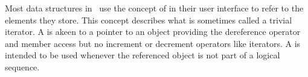 

Most data structures in \cgal\ use the concept of  in their user
interface to refer to the elements they store.  This concept describes what is
sometimes called a trivial iterator.  A  is akeen to a pointer to
an object providing the dereference operator  and member
access  but no increment or decrement operators like
iterators.  A  is intended to be used whenever the referenced
object is not part of a logical sequence.

